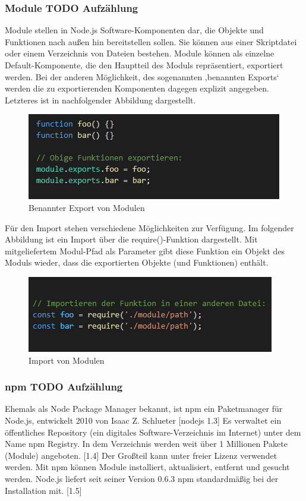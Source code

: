 \newpage
\subsubsection{Module TODO Aufzählung}

Module stellen in Node.js Software-Komponenten dar, die Objekte und Funktionen nach außen hin bereitstellen sollen. Sie können aus einer Skriptdatei oder einem Verzeichnis von Dateien bestehen. Module können als einzelne Default-Komponente, die den Hauptteil des Moduls repräsentiert, exportiert werden. Bei der anderen Möglichkeit, des sogenannten ‚benannten Exports‘ werden die zu exportierenden Komponenten dagegen explizit angegeben. Letzteres ist in nachfolgender Abbildung dargestellt. 
\newline
  
\begin{figure}[h]
\centering
\includegraphics{images/nodejs_moduleExport.PNG}
\caption{Benannter Export von Modulen}
\end{figure}
 
Für den Import stehen verschiedene Möglichkeiten zur Verfügung. Im folgender Abbildung ist ein Import über die require()-Funktion dargestellt. Mit mitgeliefertem Modul-Pfad als Parameter gibt diese Funktion ein Objekt des Moduls wieder, dass die exportierten Objekte (und Funktionen) enthält.
\newline
  
\begin{figure}[h]
\centering
\includegraphics{images/nodejs_moduleImport.PNG}
\caption{Import von Modulen}
\end{figure}

\subsubsection{npm TODO Aufzählung}
Ehemals als Node Package Manager bekannt, ist npm ein Paketmanager für Node.js, entwickelt 2010 von Isaac Z. Schlueter [nodejs 1.3] Es verwaltet ein öffentliches Repository (ein digitales Software-Verzeichnis im Internet) unter dem Name npm Registry. In dem Verzeichnis werden weit über 1 Millionen Pakete (Module) angeboten. [1.4] Der Großteil kann unter freier Lizenz verwendet werden. Mit npm können Module installiert, aktualisiert, entfernt und gesucht werden. Node.js liefert seit seiner Version 0.6.3 npm standardmäßig bei der Installation mit. [1.5]

